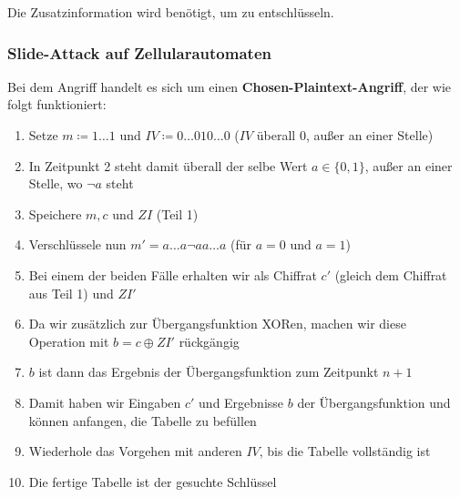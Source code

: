 \documentclass[12pt,A4]{extarticle}
\begin{document}
\par
Die Zusatzinformation wird benötigt, um zu entschlüsseln.

\subsubsection{Slide-Attack auf Zellularautomaten}
Bei dem Angriff handelt es sich um einen \textbf{Chosen-Plaintext-Angriff}, der wie folgt funktioniert:
\begin{enumerate}
  \item{Setze $m \coloneqq 1 \dots 1$ und $IV \coloneqq 0 \dots 010 \dots 0$ ($IV$ überall 0, außer an einer Stelle)}
  \item{In Zeitpunkt 2 steht damit überall der selbe Wert $a \in \{0, 1\}$, außer an einer Stelle, wo $\neg a$ steht}
  \item{Speichere $m, c$ und $ZI$ (Teil 1)}
  \item{Verschlüssele nun $m' = a \dots a \neg a a \dots a$ (für $a = 0$ und $a = 1$)}
  \item{Bei einem der beiden Fälle erhalten wir als Chiffrat $c'$ (gleich dem Chiffrat aus Teil 1) und $ZI'$}
  \item{Da wir zusätzlich zur Übergangsfunktion XORen, machen wir diese Operation mit $b = c \oplus ZI'$ rückgängig}
  \item{$b$ ist dann das Ergebnis der Übergangsfunktion zum Zeitpunkt $n+1$}
  \item{Damit haben wir Eingaben $c'$ und Ergebnisse $b$ der Übergangsfunktion und können anfangen, die Tabelle zu befüllen}
  \item{Wiederhole das Vorgehen mit anderen $IV$, bis die Tabelle vollständig ist}
  \item{Die fertige Tabelle ist der gesuchte Schlüssel}
\end{enumerate}
\end{document}
